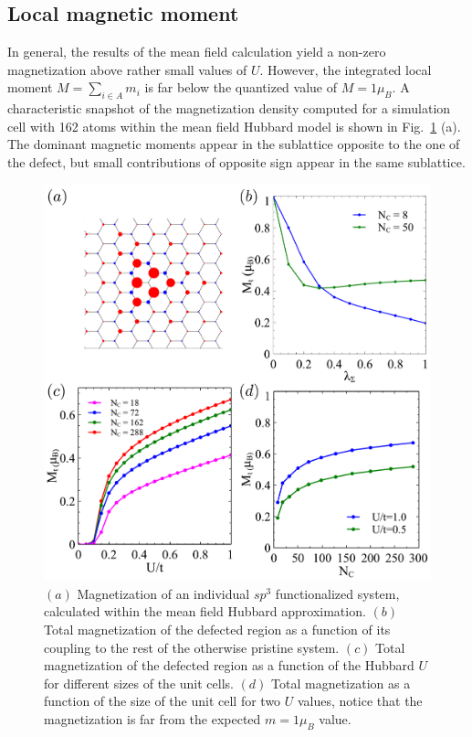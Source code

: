 \subsection{Local magnetic moment}
In general, the results of the mean field calculation yield a non-zero magnetization above rather small values of $U$. However, the integrated local moment $M=\sum_{i\in A} m_i$ is far below the quantized value of $M=1\mu_B$. A characteristic snapshot of the magnetization density computed for a simulation cell with 162 atoms within the mean field Hubbard model is shown in Fig.~\ref{MF} (a). The dominant magnetic moments appear in the sublattice opposite to the one of the defect, but small contributions of opposite sign appear in the same sublattice.
\begin{figure}[t!]
  \centering
    \includegraphics{defects/fig/figMF.pdf}
  \vspace{-15pt}
  \caption{$(a)$ Magnetization of an individual $sp^3$ functionalized system, calculated within the mean field  Hubbard  approximation. $(b)$ Total magnetization of the defected region as a function of its coupling to the rest of the otherwise pristine system. $(c)$ Total magnetization of the defected region as a function of the Hubbard $U$ for different sizes of the unit cells. $(d)$ Total magnetization as a function of the size of the unit cell for two $U$ values, notice that the magnetization is far from the expected $m=1\mu_B$ value.}
  \label{MF}
\end{figure}
